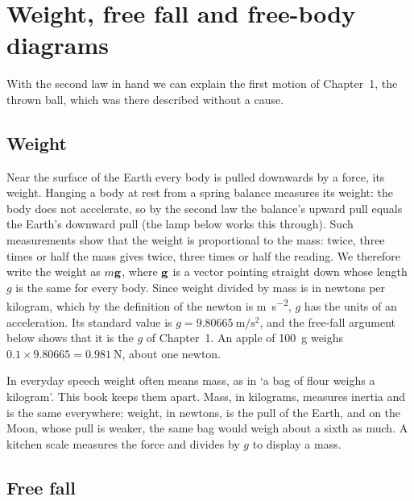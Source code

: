 \section{Weight, free fall and free-body diagrams}
\label{sec:ne-gravity}

With the second law in hand we can explain the first motion of
Chapter~1, the thrown ball, which was there described without a cause.

\subsection*{Weight}

Near the surface of the Earth every body is pulled downwards by a force,
its weight. Hanging a body at rest from a spring balance measures its
weight: the body does not accelerate, so by the second law the balance's
upward pull equals the Earth's downward pull (the lamp below works this
through). Such measurements show that the weight is proportional to the
mass: twice, three times or half the mass gives twice, three times or
half the reading. We therefore write the weight as $m\bm{\mathrm{g}}$, where $\bm{\mathrm{g}}$ is a vector
pointing straight down whose length $g$ is the same for every body. Since
weight divided by mass is in newtons per kilogram, which by the definition
of the newton is \si{\metre\per\second\squared}, $g$ has the units of an
acceleration. Its standard value is $g = \SI{9.80665}{\metre\per\second
\squared}$, and the free-fall argument below shows that it is the $g$ of
Chapter~1. An apple of \SI{100}{\gram} weighs $0.1\times
9.80665 = \SI{0.981}{\newton}$, about one newton.

In everyday speech weight often means mass, as in `a bag of flour weighs
a kilogram'. This book keeps them apart. Mass, in kilograms, measures
inertia and is the same everywhere; weight, in newtons, is the pull of the
Earth, and on the Moon, whose pull is weaker, the same bag would weigh
about a sixth as much. A kitchen scale measures the force and divides by
$g$ to display a mass.

\subsection*{Free fall}

